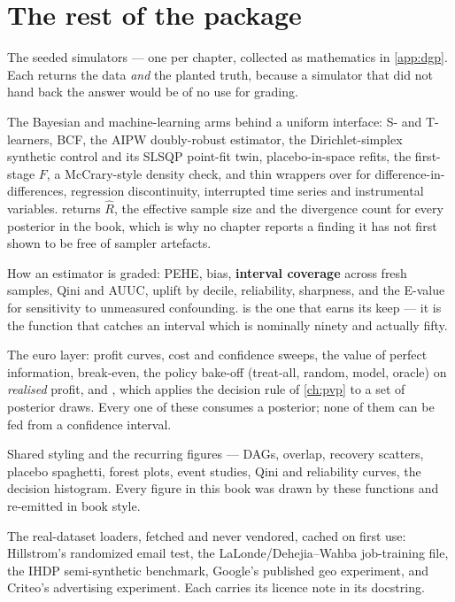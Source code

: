 \section{The rest of the package}
\label{app:cmp:rest}

\begingroup\sloppy
\begin{description}[leftmargin=1.2em, style=nextline, font=\normalfont\bfseries]
  \item[\code{cmp.dgp}] The seeded simulators --- one per chapter, collected as mathematics in
  \cref{app:dgp}. Each returns the data \emph{and} the planted truth, because a simulator that did
  not hand back the answer would be of no use for grading.

  \item[\code{cmp.estimators}] The Bayesian and machine-learning arms behind a uniform interface:
  S- and T-learners, BCF, the AIPW doubly-robust estimator, the Dirichlet-simplex synthetic control
  and its SLSQP point-fit twin, placebo-in-space refits, the first-stage $F$, a McCrary-style
  density check, and thin wrappers over  for difference-in-differences, regression
  discontinuity, interrupted time series and instrumental variables. 
  returns $\hat R$, the effective sample size and the divergence count for every posterior in the
  book, which is why no chapter reports a finding it has not first shown to be free of sampler
  artefacts.

  \item[\code{cmp.metrics}] How an estimator is graded: PEHE, bias, \textbf{interval coverage}
  across fresh samples, Qini and AUUC, uplift by decile, reliability, sharpness, and the E-value for
  sensitivity to unmeasured confounding.  is the one that earns its keep
  --- it is the function that catches an interval which is nominally ninety and actually fifty.

  \item[\code{cmp.policy}] The euro layer: profit curves, cost and confidence sweeps, the value of
  perfect information, break-even, the policy bake-off (treat-all, random, model, oracle) on
  \emph{realised} profit, and , which applies the decision rule of
  \cref{ch:pvp} to a set of posterior draws. Every one of these consumes a posterior; none of them
  can be fed from a confidence interval.

  \item[\code{cmp.plots}] Shared styling and the recurring figures --- DAGs, overlap, recovery
  scatters, placebo spaghetti, forest plots, event studies, Qini and reliability curves, the
  decision histogram. Every figure in this book was drawn by these functions and re-emitted in book
  style.

  \item[\code{cmp.data}] The real-dataset loaders, fetched and never vendored, cached on first use:
  Hillstrom's randomized email test, the LaLonde/Dehejia--Wahba job-training file, the IHDP
  semi-synthetic benchmark, Google's published geo experiment, and Criteo's advertising experiment.
  Each carries its licence note in its docstring.
\end{description}
\endgroup
